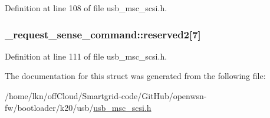 Definition at line 108 of file usb\+\_\+msc\+\_\+scsi.\+h.

\subsubsection[{\texorpdfstring{reserved2}{reserved2}}]{ \+\_\+request\+\_\+sense\+\_\+command\+::reserved2\mbox{[}7\mbox{]}}\hypertarget{struct__request__sense__command_afd61266c467e88cc5d23eeccd6437f73}{}\label{struct__request__sense__command_afd61266c467e88cc5d23eeccd6437f73}


Definition at line 111 of file usb\+\_\+msc\+\_\+scsi.\+h.



The documentation for this struct was generated from the following file\+:\begin{DoxyCompactItemize}
\item 
/home/lkn/off\+Cloud/\+Smartgrid-\/code/\+Git\+Hub/openwsn-\/fw/bootloader/k20/usb/\hyperlink{usb__msc__scsi_8h}{usb\+\_\+msc\+\_\+scsi.\+h}\end{DoxyCompactItemize}
